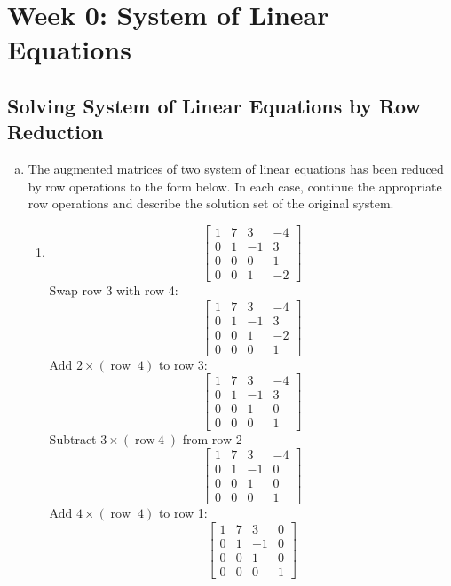 \section{Week 0: System of Linear Equations}

\subsection{Solving System of Linear Equations by Row Reduction}
\begin{enumerate}[(a)]
    \item The augmented matrices of two system of linear equations has been reduced by row operations to the form below. In each case, continue the appropriate row operations and describe the solution set of the original system.
    \begin{enumerate}[i]
        \item
        $$
        \left[\begin{array}{rrr|r}
            1 & 7 & 3 & -4 \\
            0 & 1 & -1 & 3 \\
            0 & 0 & 0 & 1 \\
            0 & 0 & 1 & -2
        \end{array}\right]
        $$
        Swap row 3 with row 4:
        $$\left[\begin{array}{ccc|c}1 & 7 & 3 & -4 \\ 0 & 1 & -1 & 3 \\ 0 & 0 & 1 & -2 \\ 0 & 0 & 0 & 1\end{array}\right]$$
        Add $2 \times(\operatorname{row}\;4)$ to row 3:
        $$\left[\begin{array}{ccc|c}1 & 7 & 3 & -4 \\ 0 & 1 & -1 & 3 \\ 0 & 0 & 1 & 0 \\ 0 & 0 & 0 & 1\end{array}\right]$$
        Subtract $3 \times(\operatorname{row \; 4})$ from row 2 $$\left[\begin{array}{cccc}1 & 7 & 3 & -4 \\ 0 & 1 & -1 & 0 \\ 0 & 0 & 1 & 0 \\ 0 & 0 & 0 & 1\end{array}\right]$$
        Add $4 \times(\operatorname{row}\;4)$ to row 1:
        $$\left[\begin{array}{lll|l}1 & 7 & 3 & 0 \\ 0 & 1 & -1 & 0 \\ 0 & 0 & 1 & 0 \\ 0 & 0 & 0 & 1\end{array}\right]$$

\end{enumerate}
\end{enumerate}
